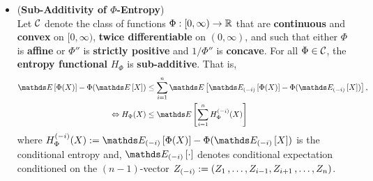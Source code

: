 \documentclass[11pt]{article}
\begin{document}
\begin{itemize}
\item \begin{proposition} (\textbf{Sub-Additivity of $\Phi$-Entropy}) \citep{boucheron2013concentration}\\
Let ${\mathcal C}$ denote the class of functions $\Phi: [0, \infty) \to {\mathbb R}$ that are \textbf{continuous} and \textbf{convex} on $[0, \infty)$, \textbf{twice differentiable} on $(0, \infty)$, and such that either $\Phi$ is \textbf{affine} or $\Phi''$ is \textbf{strictly positive} and $1/\Phi''$ is \textbf{concave}. For all $\Phi \in {\mathcal C}$, the \textbf{entropy functional} $H_{\Phi}$ is \textbf{sub-additive}. That is,
\begin{align}
\E{}{\Phi(X)} - \Phi(\E{}{X}) &\le \sum_{i=1}^{n}\E{}{\E{(-i)}{\Phi(X)} - \Phi(\E{(-i)}{X})}, \label{ineqn: sub_additivity_phi_entropy_general}\\
\Leftrightarrow H_{\Phi}(X) &\le \E{}{\sum_{i=1}^{n} H_{\Phi}^{(-i)}(X)} \nonumber
\end{align} where $H_{\Phi}^{(-i)}(X) := \E{(-i)}{\Phi(X)} - \Phi(\E{(-i)}{X})$ is the conditional entropy and, $\E{(-i)}{\cdot}$ denotes conditional expectation conditioned on the $(n-1)$-vector $Z_{(-i)}:= (Z_1 \,{,}\ldots{,}\, Z_{i-1}, Z_{i+1} \,{,}\ldots{,}\, Z_n)$.
\end{proposition}

\end{itemize}
\end{document}
